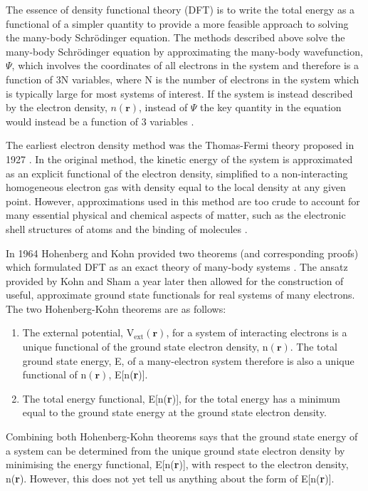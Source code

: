 \documentclass[11pt, twoside]{report}
\begin{document}
The essence of density functional theory (DFT) is to write the total energy as a functional of a simpler quantity to provide a more feasible approach to solving the many-body Schr{\"o}dinger equation. The methods described above solve the many-body Schr{\"o}dinger equation by approximating the many-body wavefunction, $\Psi$, which involves the coordinates of all electrons in the system and therefore is a function of 3N variables, where N is the number of electrons in the system which is typically large for most systems of interest. If the system is instead described by the electron density, $n(\boldsymbol{r})$, instead of $\Psi$ the key quantity in the equation would instead be a function of 3 variables \cite{Prasad_ch3}.

The earliest electron density method was the Thomas-Fermi theory proposed in 1927 \cite{Thomas-Fermi_1, Thomas-Fermi_2}. In the original method, the kinetic energy of the system is approximated as an explicit functional of the electron density, simplified to a non-interacting homogeneous electron gas with density equal to the local density at any given point.
However, approximations used in this method are too crude to account for many essential physical and chemical aspects of matter, such as the electronic shell structures of atoms and the binding of molecules \cite{RichardMartin_Ch6}.

In 1964 Hohenberg and Kohn provided two theorems (and corresponding proofs) which formulated DFT as an exact theory of many-body systems \cite{hohenberg_kohn1964}. The ansatz provided by Kohn and Sham a year later \cite{Kohn_Sham1965} then allowed for the construction of useful, approximate ground state functionals for real systems of many electrons. The two Hohenberg-Kohn theorems are as follows:

\begin{enumerate}
\item The external potential, $\mathrm{V_{ext}(\mathbf{r})}$, for a system of interacting electrons is a unique functional of the ground state electron density, $\mathrm{n(\mathbf{r})}$. The total ground state energy, E, of a many-electron system therefore is also a unique functional of n$(\mathbf{r})$, E[n(\textbf{r})].
\item The total energy functional, E[n(\textbf{r})], for the total energy has a minimum equal to the ground state energy at the ground state electron density. 
\end{enumerate}
Combining both Hohenberg-Kohn theorems says that the ground state energy of a system can be determined from the unique ground state electron density by minimising the energy functional, E[n(\textbf{r})], with respect to the electron density, n(\textbf{r}). However, this does not yet tell us anything about the form of E[n(\textbf{r})]. 
\end{document}
